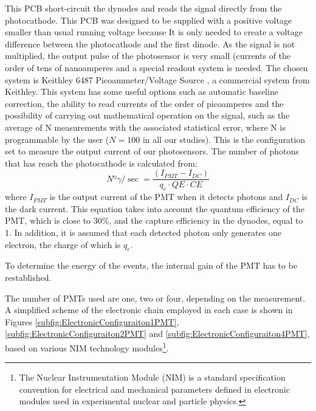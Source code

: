 This PCB short-circuit the dynodes and reads the signal directly from the photocathode. This PCB was designed to be supplied with a positive voltage smaller than usual running voltage because It is only needed to create a voltage difference between the photocathode and the first dinode. As the signal is not multiplied, the output pulse of the photosensor is very small (currents of the order of tens of nanoamperes and a special readout system is needed. The chosen system is Keithley 6487 Picoammeter/Voltage Source \cite{DataSheetKeithley6487}, a commercial system from Keithley. This system has some useful options such as automatic baseline correction, the ability to read currents of the order of picoamperes and the possibility of carrying out mathematical operation on the signal, such as the average of N measurements with the associated statistical error, where N is programmable by the user ($N=100$ in all our studies). This is the configuration set to measure the output current of our photosensors. The number of photons that has reach the photocathode is calculated from:
\begin{equation}
Nº\gamma/\sec = \frac{\left( I_{PMT} - I_{DC} \right)}{q_e \cdot{} QE \cdot{} CE}
\label{eq:NumPhotonsFromIntensityPMT}
\end{equation}
where $I_{PMT}$ is the output current of the PMT when it detects photons and $I_{DC}$ is the dark current. This equation takes into account the quantum efficiency of the PMT, which is close to $30\%$, and the capture efficiency in the dynodes, equal to 1. In addition, it is assumed that each detected photon only generates one electron, the charge of which is $q_e$.

To determine the energy of the events, the internal gain of the PMT has to be restablished. 

The number of PMTs used are one, two or four, depending on the measurement. A simplified scheme of the electronic chain employed in each case is shown in Figures \ref{subfig:ElectronicConfiguraiton1PMT}, \ref{subfig:ElectronicConfiguraiton2PMT} and \ref{subfig:ElectronicConfiguraiton4PMT}, based on various NIM technology modules\footnote{The Nuclear Instrumentation Module (NIM) is a standard specification convention for electrical and mechanical parameters defined in electronic modules used in experimental nuclear and particle physics.}.

